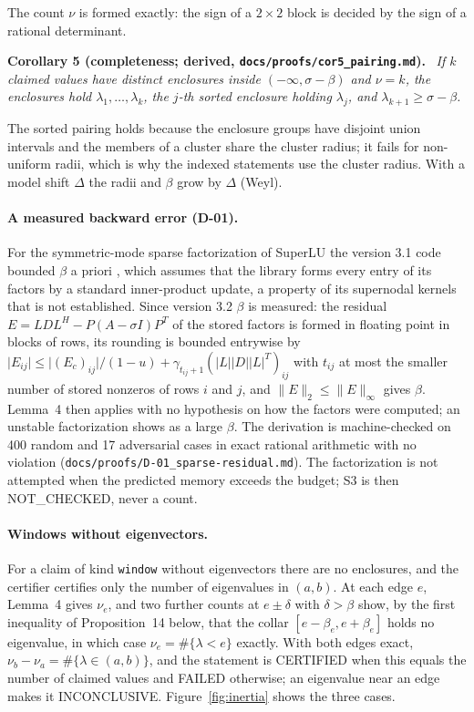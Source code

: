 \documentclass[11pt,a4paper]{article}
\newcommand{\code}[1]{\texttt{#1}}
\newcommand{\status}[1]{\textsf{#1}}
\newcommand{\CERT}{\status{CERTIFIED}}
\newcommand{\FAIL}{\status{FAILED}}
\newcommand{\INC}{\status{INCONCLUSIVE}}
\newcommand{\NC}{\status{NOT\_CHECKED}}
\newcommand{\norm}[1]{\lVert #1\rVert}
\newcommand{\abs}[1]{\lvert #1\rvert}
\newenvironment{result}[1]{\par\medskip\noindent\textbf{#1.}\ \itshape}{\par\medskip}
\begin{document}
The count $\nu$ is formed exactly: the sign of a $2\times2$ block is decided by the sign of a rational determinant.

\begin{result}{Corollary 5 (completeness; derived, \code{docs/proofs/cor5\_pairing.md})}
If $k$ claimed values have distinct enclosures inside $(-\infty,\sigma-\beta)$ and $\nu=k$, the enclosures hold
$\lambda_1,\dots,\lambda_k$, the $j$-th sorted enclosure holding $\lambda_j$, and $\lambda_{k+1}\ge\sigma-\beta$.
\end{result}

The sorted pairing holds because the enclosure groups have disjoint union intervals and the members of a cluster
share the cluster radius; it fails for non-uniform radii, which is why the indexed statements use the cluster radius.
With a model shift $\Delta$ the radii and $\beta$ grow by $\Delta$ (Weyl).

\paragraph{A measured backward error (D-01).}
For the symmetric-mode sparse factorization of SuperLU \cite{SuperLU} the version 3.1 code bounded $\beta$ a priori
\cite[Theorem~9.3]{Higham2002}, which assumes that the library forms every entry of its factors by a standard
inner-product update, a property of its supernodal kernels that is not established. Since version 3.2 $\beta$ is
measured: the residual $E=LDL^H-P(A-\sigma I)P^T$ of the stored factors is formed in floating point in blocks of rows,
its rounding is bounded entrywise by $\abs{E_{ij}}\le\abs{(E_c)_{ij}}/(1-u)+\gamma_{t_{ij}+1}(\abs{L}\abs{D}
\abs{L}^T)_{ij}$ with $t_{ij}$ at most the smaller number of stored nonzeros of rows $i$ and $j$, and
$\norm{E}_2\le\norm{E}_\infty$ gives $\beta$. Lemma~4 then applies with no hypothesis on how the factors were
computed; an unstable factorization shows as a large $\beta$. The derivation is machine-checked on 400 random and 17
adversarial cases in exact rational arithmetic with no violation (\code{docs/proofs/D-01\_sparse-residual.md}). The
factorization is not attempted when the predicted memory exceeds the budget; S3 is then \NC, never a count.

\paragraph{Windows without eigenvectors.}
For a claim of kind \code{window} without eigenvectors there are no enclosures, and the certifier certifies only the
number of eigenvalues in $(a,b)$. At each edge $e$, Lemma~4 gives $\nu_e$, and two further counts at $e\pm\delta$
with $\delta>\beta$ show, by the first inequality of Proposition~14 below, that the collar
$[e-\beta_e,e+\beta_e]$ holds no eigenvalue, in which case $\nu_e=\#\{\lambda<e\}$ exactly. With both edges exact,
$\nu_b-\nu_a=\#\{\lambda\in(a,b)\}$, and the statement is \CERT{} when this equals the number of claimed values and
\FAIL{} otherwise; an eigenvalue near an edge makes it \INC. Figure~\ref{fig:inertia} shows the three cases.
\end{document}
